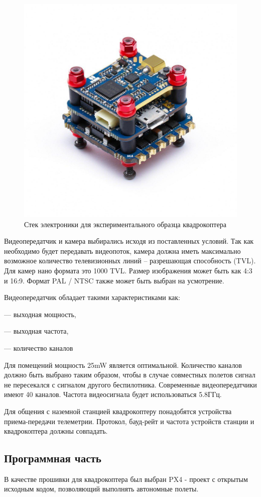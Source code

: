 \begin{figure}[H]
	\centering
	\includegraphics[width=0.5\linewidth]{pics/stack}
	\caption{Стек электроники для экспериментального образца квадрокоптера
	}
	\label{fig:stack} %
\end{figure}
Видеопередатчик и камера выбирались исходя из поставленных условий. Так как необходимо будет передавать видеопоток, камера должна иметь максимально возможное количество телевизионных линий -- разрешающая способность (TVL). Для камер нано формата это 1000 TVL. Размер изображения может быть как 4:3 и 16:9. Формат PAL / NTSC также может быть выбран на усмотрение.

Видеопередатчик обладает такими характеристиками как:

--- выходная мощность,

--- выходная частота,

--- количество каналов

Для помещений мощность 25mW является оптимальной. Количество каналов должно быть выбрано таким образом, чтобы в случае совместных полетов сигнал не пересекался с сигналом другого беспилотника. Современные видеопередатчики имеют 40 каналов. Частота видеосигнала будет использоваться 5.8ГГц.

Для общения с наземной станцией квадрокоптеру понадобятся устройства приема-передачи телеметрии. Протокол, бауд-рейт и частота устройств станции и квадрокоптера должны совпадать.

\subsection{Программная часть}
В качестве прошивки для квадрокоптера был выбран PX4 - проект с открытым исходным кодом, позволяющий выполнять автономные полеты.



